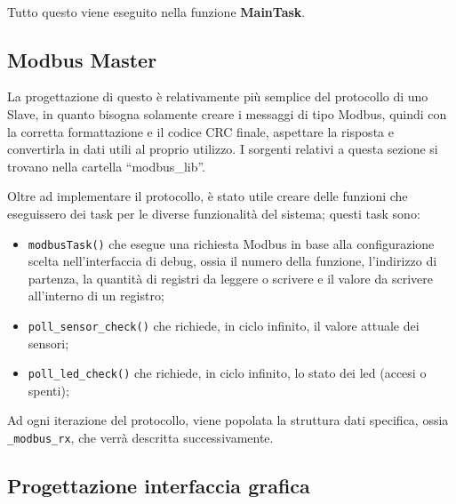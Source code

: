 \documentclass[a4paper,titlepage]{book}
\newcommand{\itema}{\begin{itemize}[noitemsep,topsep=10pt,parsep=5pt,partopsep=10pt]}
\newcommand{\code}{\lstinline}
\begin{document}
~

Tutto questo viene eseguito nella funzione \textbf{MainTask}.

\subsection{Modbus Master}

La progettazione di questo è relativamente più semplice del protocollo di uno Slave, in quanto bisogna solamente creare i messaggi di tipo Modbus, quindi con la corretta formattazione e il codice CRC finale, aspettare la risposta e convertirla in dati utili al proprio utilizzo. I sorgenti relativi a questa sezione si trovano nella cartella ``modbus\_lib''.

Oltre ad implementare il protocollo, è stato utile creare delle funzioni che eseguissero dei task per le diverse funzionalità del sistema; questi task sono:

\itema

\item \lstinline!modbusTask()! che esegue una richiesta Modbus in base alla configurazione scelta nell'interfaccia di debug, ossia il numero della funzione, l'indirizzo di partenza, la quantità di registri da leggere o scrivere e il valore da scrivere all'interno di un registro;

\item \code!poll_sensor_check()! che richiede, in ciclo infinito, il valore attuale dei sensori;

\item \code!poll_led_check()! che richiede, in ciclo infinito, lo stato dei led (accesi o spenti);

\end{itemize}

Ad ogni iterazione del protocollo, viene popolata la struttura dati specifica, ossia \code!_modbus_rx!, che verrà descritta successivamente.


\subsection{Progettazione interfaccia grafica}
\end{document}
